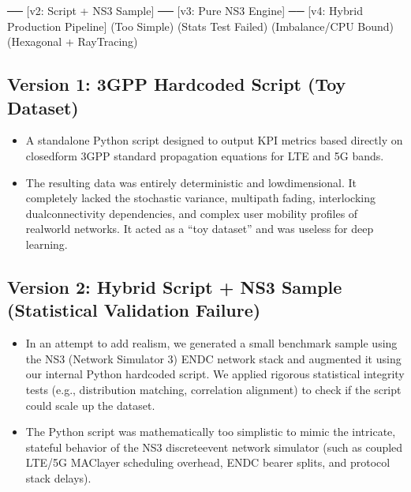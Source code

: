 \documentclass[letterpaper,10pt,english]{sphinxmanual}
\begin{document}
\begin{sphinxVerbatim} ──\PYGZgt{} [v2: Script + NS3 Sample] ──\PYGZgt{} [v3: Pure NS3 Engine] ──\PYGZgt{} [v4: Hybrid Production Pipeline]
     (Too Simple)              (Stats Test Failed)         (Imbalance/CPU Bound)         (Hexagonal + Ray\PYGZhy{}Tracing)
\end{sphinxVerbatim}


\subsection{Version 1: 3GPP Hardcoded Script (Toy Dataset)}
\label{\detokenize{dataset:version-1-3gpp-hardcoded-script-toy-dataset}}\begin{itemize}
\item {} 
\sphinxAtStartPar
{} A standalone Python script designed to output KPI metrics based directly on closed\sphinxhyphen{}form 3GPP standard propagation equations for LTE and 5G bands.

\item {} 
\sphinxAtStartPar
{} The resulting data was entirely deterministic and low\sphinxhyphen{}dimensional. It completely lacked the stochastic variance, multi\sphinxhyphen{}path fading, interlocking dual\sphinxhyphen{}connectivity dependencies, and complex user mobility profiles of real\sphinxhyphen{}world networks. It acted as a “toy dataset” and was useless for deep learning.

\end{itemize}


\subsection{Version 2: Hybrid Script + NS3 Sample (Statistical Validation Failure)}
\label{\detokenize{dataset:version-2-hybrid-script-ns3-sample-statistical-validation-failure}}\begin{itemize}
\item {} 
\sphinxAtStartPar
{} In an attempt to add realism, we generated a small benchmark sample using the NS\sphinxhyphen{}3 (Network Simulator 3) EN\sphinxhyphen{}DC network stack and augmented it using our internal Python hardcoded script. We applied rigorous statistical integrity tests (e.g., distribution matching, correlation alignment) to check if the script could scale up the dataset.

\item {} 
\sphinxAtStartPar
{}  The Python script was mathematically too simplistic to mimic the intricate, stateful behavior of the NS\sphinxhyphen{}3 discrete\sphinxhyphen{}event network simulator (such as coupled LTE/5G MAC\sphinxhyphen{}layer scheduling overhead, EN\sphinxhyphen{}DC bearer splits, and protocol stack delays).

\end{itemize}
\end{document}

